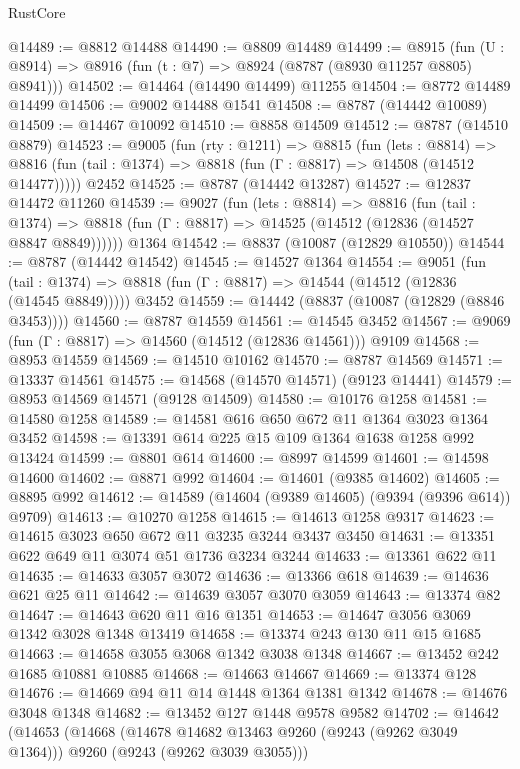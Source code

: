 \begin{lexlean}{RustCore}
\begin{coremodule}
@14489 := @8812 @14488
@14490 := @8809 @14489
@14499 := @8915
    (fun (U : @8914) => @8916 (fun (t : @7) => @8924 (@8787 (@8930 @11257 @8805) @8941)))
@14502 := @14464 (@14490 @14499) @11255
@14504 := @8772 @14489 @14499
@14506 := @9002 @14488 @1541
@14508 := @8787 (@14442 @10089)
@14509 := @14467 @10092
@14510 := @8858 @14509
@14512 := @8787 (@14510 @8879)
@14523 := @9005
    (fun (rty : @1211) =>
    @8815
      (fun (lets : @8814) =>
      @8816 (fun (tail : @1374) => @8818 (fun (Γ : @8817) => @14508 (@14512 @14477)))))
    @2452
@14525 := @8787 (@14442 @13287)
@14527 := @12837 @14472 @11260
@14539 := @9027
    (fun (lets : @8814) =>
    @8816
      (fun (tail : @1374) =>
      @8818 (fun (Γ : @8817) => @14525 (@14512 (@12836 (@14527 @8847 @8849))))))
    @1364
@14542 := @8837 (@10087 (@12829 @10550))
@14544 := @8787 (@14442 @14542)
@14545 := @14527 @1364
@14554 := @9051
    (fun (tail : @1374) => @8818 (fun (Γ : @8817) => @14544 (@14512 (@12836 (@14545 @8849)))))
    @3452
@14559 := @14442 (@8837 (@10087 (@12829 (@8846 @3453))))
@14560 := @8787 @14559
@14561 := @14545 @3452
@14567 := @9069 (fun (Γ : @8817) => @14560 (@14512 (@12836 @14561))) @9109
@14568 := @8953 @14559
@14569 := @14510 @10162
@14570 := @8787 @14569
@14571 := @13337 @14561
@14575 := @14568 (@14570 @14571) (@9123 @14441)
@14579 := @8953 @14569 @14571 (@9128 @14509)
@14580 := @10176 @1258
@14581 := @14580 @1258
@14589 := @14581 @616 @650 @672 @11 @1364 @3023 @1364 @3452
@14598 := @13391 @614 @225 @15 @109 @1364 @1638 @1258 @992 @13424
@14599 := @8801 @614
@14600 := @8997 @14599
@14601 := @14598 @14600
@14602 := @8871 @992
@14604 := @14601 (@9385 @14602)
@14605 := @8895 @992
@14612 := @14589 (@14604 (@9389 @14605) (@9394 (@9396 @614)) @9709)
@14613 := @10270 @1258
@14615 := @14613 @1258 @9317
@14623 := @14615 @3023 @650 @672 @11 @3235 @3244 @3437 @3450
@14631 := @13351 @622 @649 @11 @3074 @51 @1736 @3234 @3244
@14633 := @13361 @622 @11
@14635 := @14633 @3057 @3072
@14636 := @13366 @618
@14639 := @14636 @621 @25 @11
@14642 := @14639 @3057 @3070 @3059
@14643 := @13374 @82
@14647 := @14643 @620 @11 @16 @1351
@14653 := @14647 @3056 @3069 @1342 @3028 @1348 @13419
@14658 := @13374 @243 @130 @11 @15 @1685
@14663 := @14658 @3055 @3068 @1342 @3038 @1348
@14667 := @13452 @242 @1685 @10881 @10885
@14668 := @14663 @14667
@14669 := @13374 @128
@14676 := @14669 @94 @11 @14 @1448 @1364 @1381 @1342
@14678 := @14676 @3048 @1348
@14682 := @13452 @127 @1448 @9578 @9582
@14702 := @14642
    (@14653
      (@14668
        (@14678 @14682 @13463 @9260 (@9243 (@9262 @3049 @1364)))
        @9260
        (@9243 (@9262 @3039 @3055)))

\end{coremodule}
\end{lexlean}

